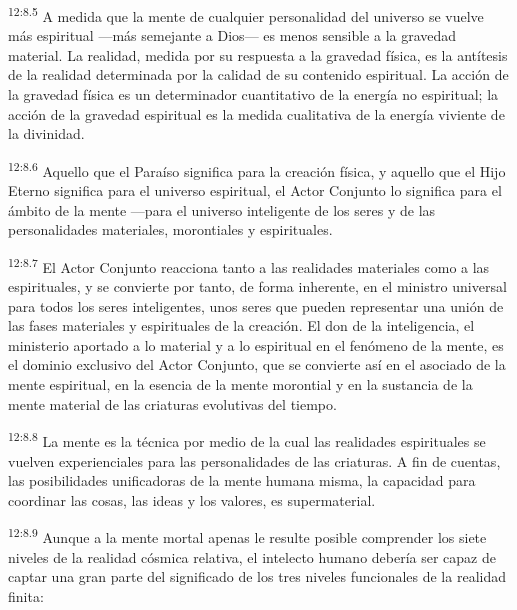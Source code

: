 \par
\textsuperscript{12:8.5} A medida que la mente de cualquier personalidad del universo se vuelve más espiritual ---más semejante a Dios--- es menos sensible a la gravedad material. La realidad, medida por su respuesta a la gravedad física, es la antítesis de la realidad determinada por la calidad de su contenido espiritual. La acción de la gravedad física es un determinador cuantitativo de la energía no espiritual; la acción de la gravedad espiritual es la medida cualitativa de la energía viviente de la divinidad.

\par
\textsuperscript{12:8.6} Aquello que el Paraíso significa para la creación física, y aquello que el Hijo Eterno significa para el universo espiritual, el Actor Conjunto lo significa para el ámbito de la mente ---para el universo inteligente de los seres y de las personalidades materiales, morontiales y espirituales.

\par
\textsuperscript{12:8.7} El Actor Conjunto reacciona tanto a las realidades materiales como a las espirituales, y se convierte por tanto, de forma inherente, en el ministro universal para todos los seres inteligentes, unos seres que pueden representar una unión de las fases materiales y espirituales de la creación. El don de la inteligencia, el ministerio aportado a lo material y a lo espiritual en el fenómeno de la mente, es el dominio exclusivo del Actor Conjunto, que se convierte así en el asociado de la mente espiritual, en la esencia de la mente morontial y en la sustancia de la mente material de las criaturas evolutivas del tiempo.

\par
\textsuperscript{12:8.8} La mente es la técnica por medio de la cual las realidades espirituales se vuelven experienciales para las personalidades de las criaturas. A fin de cuentas, las posibilidades unificadoras de la mente humana misma, la capacidad para coordinar las cosas, las ideas y los valores, es supermaterial.

\par
\textsuperscript{12:8.9} Aunque a la mente mortal apenas le resulte posible comprender los siete niveles de la realidad cósmica relativa, el intelecto humano debería ser capaz de captar una gran parte del significado de los tres niveles funcionales de la realidad finita:

